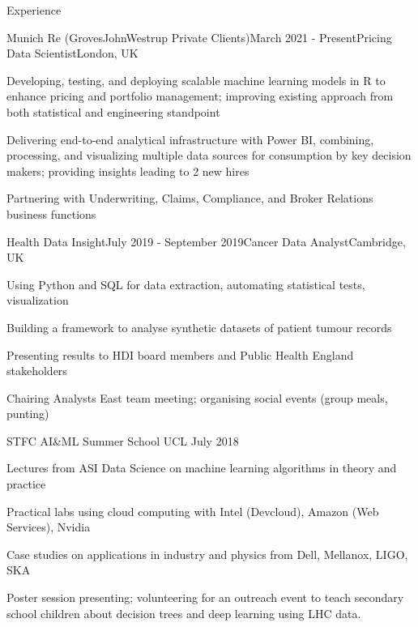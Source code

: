 \documentclass{resume} %
\begin{document}
\begin{rSection}{Experience}
	
\begin{rSubsection}{Munich Re (GrovesJohnWestrup Private Clients)}{March 2021 - Present}{Pricing Data Scientist}{London, UK}
	\item Developing, testing, and deploying scalable machine learning models in R to enhance pricing and portfolio management; improving existing approach from both statistical and engineering standpoint
	\item Delivering end-to-end analytical infrastructure with Power BI, combining, processing, and visualizing multiple data sources for consumption by key decision makers; providing insights leading to 2 new hires
	\item Partnering with Underwriting, Claims, Compliance, and Broker Relations business functions %
\end{rSubsection}


\begin{rSubsection}{Health Data Insight}{July 2019 - September 2019}{Cancer Data Analyst}{Cambridge, UK}
\item Using Python and SQL for data extraction, automating statistical tests, visualization
\item Building a framework to analyse synthetic datasets of patient tumour records
\item Presenting results to HDI board members and Public Health England stakeholders
\item Chairing Analysts East team meeting; organising social events (group meals, punting)
\end{rSubsection}


\begin{rSubsection}{STFC AI\&ML Summer School UCL
}{July 2018}{}{}
\item Lectures from ASI Data Science on machine learning algorithms in theory and practice
\item Practical labs using cloud computing with Intel (Devcloud), Amazon (Web Services), Nvidia
\item Case studies on applications in industry and physics from Dell, Mellanox, LIGO, SKA
\item Poster session presenting; volunteering for an outreach event to teach secondary school children about decision trees and deep learning using LHC data.
\end{rSubsection}


\end{rSection}
\end{document}
